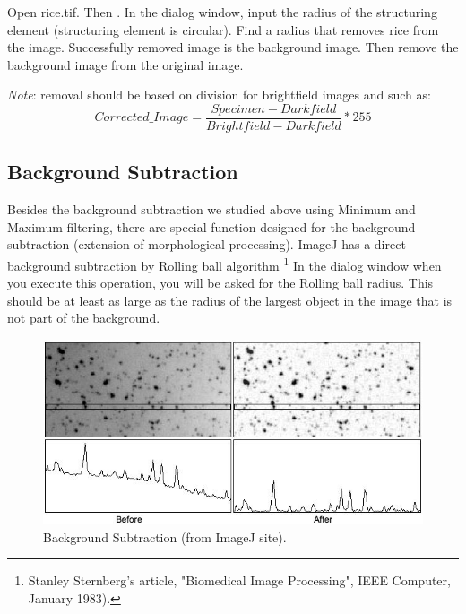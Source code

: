 \begin{indentexercise}{1}
\label{exer:removerice}
Open rice.tif. Then . In the dialog
window, input the radius of the structuring element (structuring
element is circular). Find a radius that removes rice from the image.
Successfully removed image is the background image. Then remove the
background image from the original image. 

\textit{Note}: removal should
be based on division for brightfield images and such as: 
\[
Corrected\_Image = \frac{Specimen - Darkfield}{Brightfield - Darkfield} * 255
\]
\end{indentexercise}



\subsection{Background Subtraction}

Besides the background subtraction we studied above using Minimum and
Maximum filtering, there are special function designed for the
background subtraction (extension of morphological processing). ImageJ
has a direct background subtraction by Rolling ball algorithm \footnote{
Stanley Sternberg's article, "Biomedical Image Processing", IEEE Computer, January 1983). }
In the dialog window when you execute this operation, you will be asked for
the Rolling ball radius. This should be at least as large as
the radius of the largest object in the image that is not part of the
background.

\begin{figure}[htbp]
\begin{center}
\includegraphics[width=11.875cm]{img/CMCIBasicCourse201102-img69.jpg}
\caption{ Background Subtraction (from ImageJ site).}
\label{fig:img69}
\end{center}
\end{figure}


